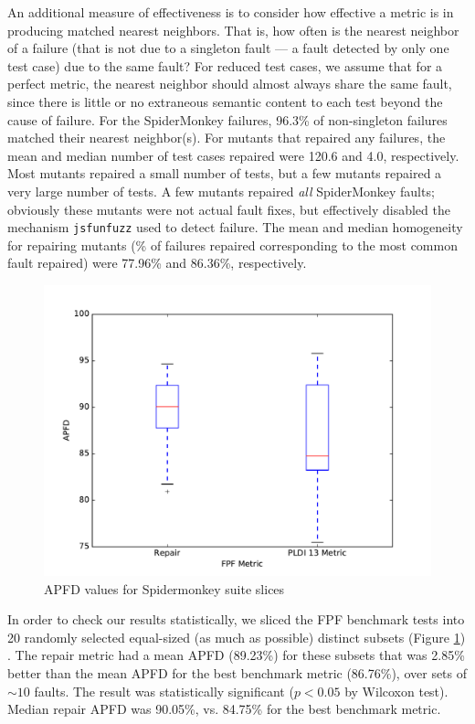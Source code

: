 An additional measure of effectiveness is to consider how effective a metric is in producing matched nearest neighbors.  That is, how often is the nearest neighbor of a failure (that is not due to a singleton fault --- a fault detected by only one test case) due to the same fault?  For reduced \cite{DD,PLDI13,
CReduce} test cases, we assume that for a perfect metric, the nearest neighbor should almost always share the same fault, since there is little or no extraneous semantic content to each test beyond the cause of failure.  For the SpiderMonkey failures, 96.3\% of non-singleton failures matched their nearest neighbor(s).  For mutants that repaired any failures, the mean and median number of test cases repaired were 120.6 and 4.0, respectively.  Most mutants repaired a small number of tests, but a few mutants repaired a very large number of tests.  A few mutants repaired \emph{all} SpiderMonkey faults; obviously these mutants were not actual fault fixes, but effectively disabled the mechanism {\tt jsfunfuzz} used to detect failure. The mean and median homogeneity for repairing mutants (\% of failures repaired corresponding to the most common fault repaired) were 77.96\% and 86.36\%, respectively.  

\begin{figure}
  \centering
  \includegraphics[width=0.95\columnwidth]{comparejs}
  \caption{APFD values for Spidermonkey suite slices}
  \label{comparejs}
\end{figure}%


In order to check our results statistically, we sliced the FPF benchmark tests into 20 randomly selected equal-sized (as much as possible) distinct subsets (Figure \ref{comparejs}) .  The repair metric had a mean APFD (89.23\%) for these subsets that was 2.85\% better than the mean APFD for the best benchmark metric (86.76\%), over sets of $\sim 10$ faults. The result was statistically significant ($p < 0.05$ by Wilcoxon test).   Median repair APFD was 90.05\%, vs. 84.75\% for the best benchmark metric.



